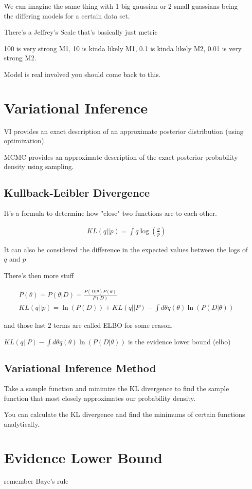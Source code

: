 \documentclass[fleqn]{report}
\newcommand{\equations} [1] {
\begin{gather*}
#1
\end{gather*}
}
\begin{document}
We can imagine the same thing with 1 big gaussian or 2 small guassians 
being the differing models for a certain data set.

There's a Jeffrey's Scale that's basically just metric 

100 is very strong M1, 10 is kinda likely M1, 0.1 is kinda likely M2, 
0.01 is very strong M2. 

Model is real involved you should come back to this. 

\section{Variational Inference}
VI provides an exact description of an approximate posterior distribution 
(using optimization).

MCMC provides an approximate description of the exact posterior 
probability density using sampling.

\subsection{Kullback-Leibler Divergence}
It's a formula to determine how "close" two functions are to each other. 
\equations{
    KL(q || p) 
    =
    \int 
    q 
    \log(
    \frac{q}{p})
}

It can also be considered the difference in the expected values 
between the logs of $q$ and $p$

There's then more stuff 
\equations{
    P(\theta) = 
    P(\theta | D )
    =
    \frac{P(D | \theta) P(\theta)}{P(D)}
    \\
    KL(q || p)
    =
    \ln(P(D))
    +
    KL(q || P)
    -
    \int d \theta q(\theta) \ln(P(D | \theta))
}
and those last 2 terms are called ELBO for some reason. 

$
    KL(q || P)
    -
    \int d \theta q(\theta) \ln(P(D | \theta))
$
is the evidence lower bound (elbo)

\subsection{Variational Inference Method}
Take a sample function and minimize the KL divergence to find the sample 
function that most closely approximates our probability density.

You can calculate the KL divergence and find the minimums 
of certain functions analytically. 


\section{Evidence Lower Bound}
remember Baye's rule 
\end{document}
